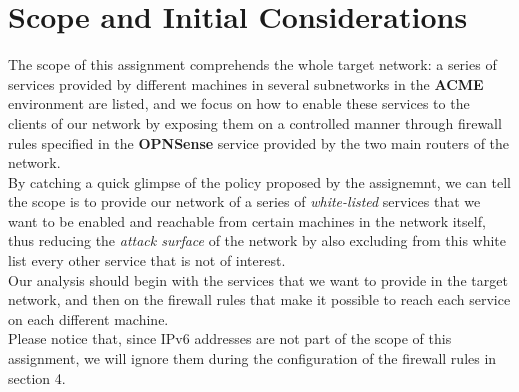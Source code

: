 \section{Scope and Initial Considerations}
The scope of this assignment comprehends the whole target network: a series of services provided by different machines in several subnetworks in the \textbf{ACME} environment are listed, and we focus on how to enable these services to the clients of our network by exposing them on a controlled manner through firewall rules specified in the \textbf{OPNSense} service provided by the two main routers of the network.\\
By catching a quick glimpse of the policy proposed by the assignemnt, we can tell the scope is to provide our network of a series of \textit{white-listed} services that we want to be enabled and reachable from certain machines in the network itself, thus reducing the \textit{attack surface} of the network by also excluding from this white list every other service that is not of interest.\\
Our analysis should begin with the services that we want to provide in the target network, and then on the firewall rules that make it possible to reach each service on each different machine.\\
Please notice that, since IPv6 addresses are not part of the scope of this assignment, we will ignore them during the configuration of the firewall rules in section 4.\\
